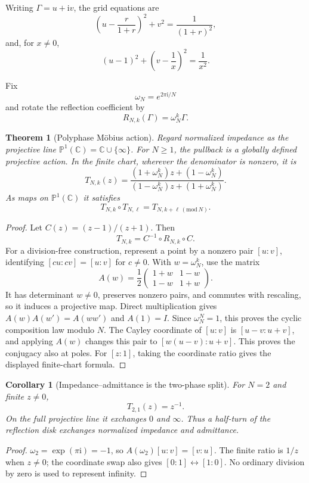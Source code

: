 \documentclass[11pt,letterpaper]{article}
\newtheorem{theorem}{Theorem}[section]
\theoremstyle{plain}
\theoremstyle{plain}
\theoremstyle{plain}
\newtheorem{corollary}[corollary]{Corollary}
\theoremstyle{definition}
\theoremstyle{definition}
\theoremstyle{definition}
\theoremstyle{definition}
\theoremstyle{remark}
\theoremstyle{remark}
\theoremstyle{remark}
\theoremstyle{remark}
\newcommand{\bbC}{\mathbb C}
\newcommand{\Gam}{\Gamma}
\newcommand{\ii}{\mathrm i}
\begin{document}
Writing $\Gam=u+\ii v$, the grid equations are
\[
\left(u-\frac{r}{1+r}\right)^2+v^2=\frac1{(1+r)^2},
\]
and, for $x\ne0$,
\[
(u-1)^2+\left(v-\frac1x\right)^2=\frac1{x^2}.
\]

Fix
\[
\omega_N=e^{2\pi\ii/N}
\]
and rotate the reflection coefficient by
\[
R_{N,k}(\Gam)=\omega_N^k\Gam.
\]

\begin{theorem}[Polyphase M\"obius action]\label{result:18}
Regard normalized impedance as the projective line $\mathbb P^1(\bbC)=\bbC\cup\{\infty\}$. For $N\ge1$, the pullback is a globally defined projective action. In the finite chart, wherever the denominator is nonzero, it is
\[
\boxed{
T_{N,k}(z)
=
\frac{(1+\omega_N^k)z+(1-\omega_N^k)}
{(1-\omega_N^k)z+(1+\omega_N^k)}.
}
\]
As maps on $\mathbb P^1(\bbC)$ it satisfies
\[
T_{N,k}\circ T_{N,\ell}=T_{N,k+\ell\, (\mathrm{mod}\,N)}.
\]
\end{theorem}

\begin{proof}
Let $C(z)=(z-1)/(z+1)$. Then
\[
T_{N,k}=C^{-1}\circ R_{N,k}\circ C.
\]
For a division-free construction, represent a point by a nonzero pair $[u:v]$, identifying $[cu:cv]=[u:v]$ for $c\ne0$. With $w=\omega_N^k$, use the matrix
\[
A(w)=\frac12\begin{pmatrix}1+w&1-w\\1-w&1+w\end{pmatrix}.
\]
It has determinant $w\ne0$, preserves nonzero pairs, and commutes with rescaling, so it induces a projective map. Direct multiplication gives $A(w)A(w')=A(ww')$ and $A(1)=I$. Since $\omega_N^N=1$, this proves the cyclic composition law modulo $N$. The Cayley coordinate of $[u:v]$ is $[u-v:u+v]$, and applying $A(w)$ changes this pair to $[w(u-v):u+v]$. This proves the conjugacy also at poles. For $[z:1]$, taking the coordinate ratio gives the displayed finite-chart formula.
\end{proof}

\begin{corollary}[Impedance--admittance is the two-phase split]\label{result:19}
For $N=2$ and finite $z\ne0$,
\[
\boxed{T_{2,1}(z)=z^{-1}.}
\]
On the full projective line it exchanges $0$ and $\infty$. Thus a half-turn of the reflection disk exchanges normalized impedance and admittance.
\end{corollary}
\begin{proof}
$\omega_2=\exp(\pi\ii)=-1$, so $A(\omega_2)[u:v]=[v:u]$. The finite ratio is $1/z$ when $z\ne0$; the coordinate swap also gives $[0:1]\leftrightarrow[1:0]$. No ordinary division by zero is used to represent infinity.
\end{proof}
\end{document}
